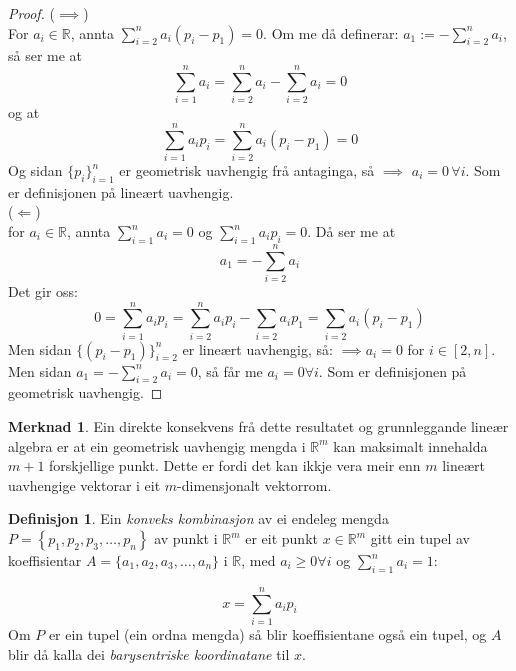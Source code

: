 \documentclass[a4paper, titlepage, 12pt, norsk]{article}
\theoremstyle{plain}
\theoremstyle{definition}
\newtheorem{definition}[theorem]{Definisjon}
\newtheorem{remark}[theorem]{Merknad}
\newcommand{\Rb}{\mathbb{R}}
\newcommand{\set}[1]{ \left \{ #1 \right \} } %
\begin{document}
\begin{proof}
	($\implies$)
	\\For $a_i\in\Rb$, annta $\sum_{i=2}^na_i(p_i-p_1)=0$. Om me då definerar: $a_1 := -\sum_{i=2}^na_i$, så ser me at 
	\begin{equation*}
		\sum_{i=1}^na_i=\sum_{i=2}^na_i-\sum_{i=2}^na_i=0
	\end{equation*}
	og at 
	\begin{equation*}
		\sum_{i=1}^na_ip_i=\sum_{i=2}^na_i(p_i-p_1)=0
	\end{equation*}
	Og sidan $\{p_i\}_{i=1}^n$ er geometrisk uavhengig frå antaginga, så $\implies$ $a_i=0 \, \forall i$. Som er definisjonen på lineært uavhengig.
	\\(\(\Longleftarrow\))
	\\for $a_i\in\Rb$, annta $\sum_{i=1}^n a_i=0$ og $\sum_{i=1}^n a_ip_i=0$. Då ser me at 
	\begin{equation*}
		a_1=-\sum_{i=2}^n a_i
	\end{equation*} 
	Det gir oss: 
	\begin{equation*}
		0=\sum_{i=1}^n a_ip_i=\sum_{i=2}^n a_ip_i-\sum_{i=2}a_ip_1=\sum_{i=2}a_i(p_i-p_1)
	\end{equation*}
	Men sidan $\{(p_i-p_1)\}_{i=2}^n$ er lineært uavhengig, så: $\implies a_i = 0$ for $i\in[2,n]$. Men sidan $a_1 = -\sum_{i=2}^n a_i=0$, så får me $a_i=0 \forall i$. Som er definisjonen på geometrisk uavhengig.
\end{proof}

\begin{remark}
	Ein direkte konsekvens frå dette resultatet og grunnleggande lineær algebra er at ein geometrisk uavhengig mengda i $\Rb^m$ kan maksimalt innehalda $m+1$ forskjellige punkt. Dette er fordi det kan ikkje vera meir enn $m$ lineært uavhengige vektorar i eit $m$-dimensjonalt vektorrom.
\end{remark}

\begin{definition}
	Ein \emph{konveks kombinasjon} av ei endeleg mengda \( P = \set{p_1, p_2, p_3, \dots, p_n} \) av punkt i \( \Rb^m \) er eit punkt \( x\in\Rb^m \) gitt ein tupel av koeffisientar \( A=\{a_1, a_2, a_3, \dots, a_n\} \) i \( \Rb \), med \( a_i\geq0\forall i \) og \( \sum_{i=1}^n a_i = 1 : \)
	
	\begin{equation*}
		x=\sum_{i=1}^n a_ip_i
	\end{equation*}
	Om $P$ er ein tupel (ein ordna mengda) så blir koeffisientane også ein tupel, og $A$ blir då kalla dei \emph{barysentriske koordinatane} til $x$.
\end{definition}
\end{document}
